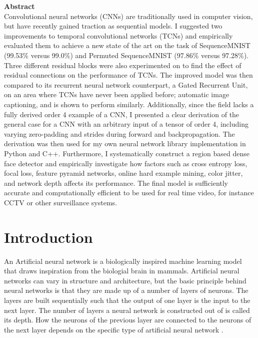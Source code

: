 \documentclass[a4paper, twoside]{article}
\begin{document}
\newpage

\Large{\textbf{Abstract}}\\
\normalsize{}
Convolutional neural networks (CNNs) are traditionally used in computer vision, but have recently gained traction as sequential models. I suggested two improvements to temporal convolutional networks (TCNs) and empirically evaluated them to achieve a new state of the art on the task of SequenceMNIST (99.53\% versus 99.0\%) and Permuted SequenceMNIST (97.86\% versus 97.28\%). Three different residual blocks were also experimented on to find the effect of residual connections on the performance of TCNs. The improved model was then compared to its recurrent neural network counterpart, a Gated Recurrent Unit, on an area where TCNs have never been applied before; automatic image captioning, and is shown to perform similarly. Additionally, since the field lacks a fully derived order 4 example of a CNN, I presented a clear derivation of the general case for a CNN with an arbitrary input of a tensor of order 4, including varying zero-padding and strides during forward and backpropagation. The derivation was then used for my own neural network library implementation in Python and C++. Furthermore, I systematically construct a region based dense face detector and empirically investigate how factors such as cross entropy loss, focal loss, feature pyramid networks, online hard example mining, color jitter, and network depth affects its performance. The final model is sufficiently accurate and computationally efficient to be used for real time video, for instance CCTV or other surveillance systems.

\newpage

\tableofcontents
\newpage
\section{Introduction}

An Artificial neural network is a biologically inspired machine learning model that draws inspiration from the biologial brain in mammals. Artificial neural networks can vary in structure and architecture, but the basic principle behind neural networks is that they are made up of a number of layers of neurons. The layers are built sequentially such that the output of one layer is the input to the next layer. The number of layers a neural network is constructed out of is called its depth. How the neurons of the previous layer are connected to the neurons of the next layer depends on the specific type of artificial neural network \cite{cs231n}.
\end{document}

